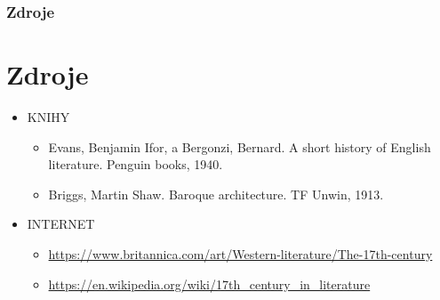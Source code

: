 \documentclass[dvipsnames]{beamer}
\begin{document}
\begin{frame}
	\frametitle{Zdroje}
	\section{Zdroje}
	\begin{itemize}
		\large \item KNIHY
		\begin{itemize}\tiny
			\item Evans, Benjamin Ifor, a Bergonzi, Bernard. A short history of English literature. Penguin books, 1940.
			\item Briggs, Martin Shaw. Baroque architecture. TF Unwin, 1913.
		\end{itemize}
		\large \item INTERNET
		\begin{itemize}
			\tiny
			\item   \url{https://www.britannica.com/art/Western-literature/The-17th-century}
			\item   \url{https://en.wikipedia.org/wiki/17th\_century\_in\_literature}
			\normalsize
		\end{itemize}
	\end{itemize}
\end{frame}
\end{document}
